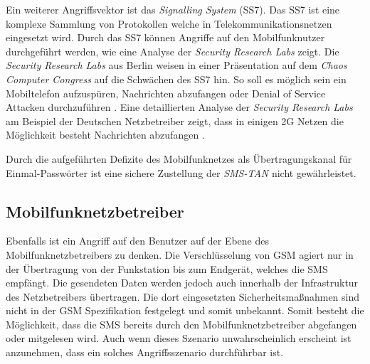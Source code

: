 \documentclass[11pt,a4paper,ngerman]{scrreprt}
\begin{document}
Ein weiterer Angriffsvektor ist das \textit{Signalling System} (SS7). Das SS7 ist eine komplexe Sammlung von Protokollen welche in Telekommunikationsnetzen eingesetzt wird. Durch das SS7 können Angriffe auf den Mobilfunknutzer durchgeführt werden, wie eine Analyse der \textit{Security Research Labs} zeigt. Die \textit{Security Research Labs} aus Berlin weisen in einer Präsentation auf dem \textit{Chaos Computer Congress} auf die Schwächen des SS7 hin. So soll es möglich sein ein Mobiltelefon aufzuspüren, Nachrichten abzufangen oder Denial of Service Attacken durchzuführen \cite{cccMob}. Eine detaillierten Analyse der \textit{Security Research Labs} am Beispiel der Deutschen Netzbetreiber zeigt, dass in einigen 2G Netzen die Möglichkeit besteht Nachrichten abzufangen \cite{srlMobSec}.

Durch die aufgeführten Defizite des Mobilfunknetzes als Übertragungskanal für Einmal-Passwörter ist eine sichere Zustellung der \textit{SMS-TAN} nicht gewährleistet.
\subsection*{Mobilfunknetzbetreiber}
Ebenfalls ist ein Angriff auf den Benutzer auf der Ebene des Mobilfunknetzbetreibers zu denken. Die Verschlüsselung von GSM agiert nur in der Übertragung von der Funkstation bis zum Endgerät, welches die SMS empfängt. Die gesendeten Daten werden jedoch auch innerhalb der Infrastruktur des Netzbetreibers übertragen. Die dort eingesetzten Sicherheitsmaßnahmen sind nicht in der GSM Spezifikation festgelegt und somit unbekannt. Somit besteht die Möglichkeit, dass die SMS bereits durch den Mobilfunknetzbetreiber abgefangen oder mitgelesen wird. Auch wenn dieses Szenario unwahrscheinlich erscheint ist anzunehmen, dass ein solches Angriffsszenario durchführbar ist.
\end{document}
